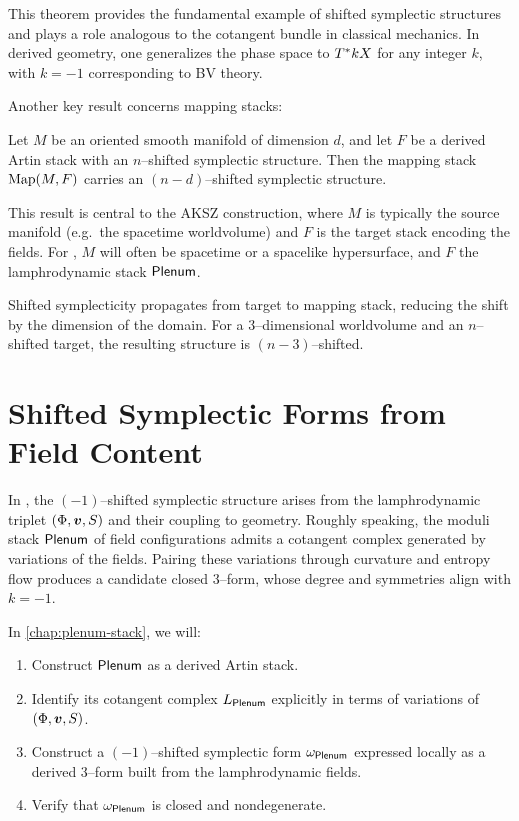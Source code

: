 This theorem provides the fundamental example of shifted symplectic structures
and plays a role analogous to the cotangent bundle in classical mechanics. In
derived geometry, one generalizes the phase space to $T^{\ast}kX$ for any
integer $k$, with $k=-1$ corresponding to BV theory.

Another key result concerns mapping stacks:

\begin{theorem}[PTVV]
Let $M$ be an oriented smooth manifold of dimension $d$, and let $F$ be a
derived Artin stack with an $n$--shifted symplectic structure. Then the
mapping stack $\operatorname{Map}(M,F)$ carries an $(n-d)$--shifted symplectic structure.
\end{theorem}

This result is central to the AKSZ construction, where $M$ is typically the
source manifold (e.g.\ the spacetime worldvolume) and $F$ is the target stack
encoding the fields. For \rsvpabbr{}, $M$ will often be spacetime or a
spacelike hypersurface, and $F$ the lamphrodynamic stack $\mathsf{Plenum}$.

\Intuition
Shifted symplecticity propagates from target to mapping stack, reducing the
shift by the dimension of the domain. For a $3$--dimensional worldvolume and
an $n$--shifted target, the resulting structure is $(n-3)$--shifted.

\section{Shifted Symplectic Forms from Field Content}

In \rsvpabbr{}, the $(-1)$--shifted symplectic structure arises from the
lamphrodynamic triplet $(\Phi,\bm{v},S)$ and their coupling to
geometry. Roughly speaking, the moduli stack $\mathsf{Plenum}$ of field configurations
admits a cotangent complex generated by variations of the fields. Pairing these
variations through curvature and entropy flow produces a candidate closed
$3$--form, whose degree and symmetries align with $k=-1$.

In \cref{chap:plenum-stack}, we will:
\begin{enumerate}
  \item Construct $\mathsf{Plenum}$ as a derived Artin stack.
  \item Identify its cotangent complex $L_{\mathsf{Plenum}}$ explicitly in terms of
        variations of $(\Phi,\bm{v},S)$.
  \item Construct a $(-1)$--shifted symplectic form $\omega_{\mathsf{Plenum}}$
        expressed locally as a derived $3$--form built from the lamphrodynamic
        fields.
  \item Verify that $\omega_{\mathsf{Plenum}}$ is closed and nondegenerate.
\end{enumerate}

